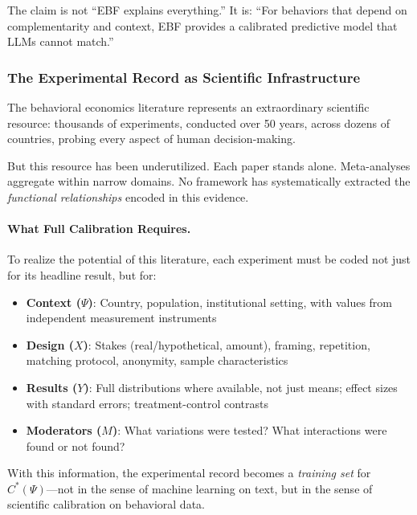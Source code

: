 The claim is not ``EBF explains everything.'' It is: ``For behaviors
that depend on complementarity and context, EBF provides a calibrated
predictive model that LLMs cannot match.''


\subsubsection{The Experimental Record as Scientific Infrastructure}

The behavioral economics literature represents an extraordinary scientific
resource: thousands of experiments, conducted over 50 years, across dozens
of countries, probing every aspect of human decision-making.

But this resource has been underutilized. Each paper stands alone. Meta-analyses
aggregate within narrow domains. No framework has systematically extracted
the \emph{functional relationships} encoded in this evidence.

\paragraph{What Full Calibration Requires.}
To realize the potential of this literature, each experiment must be coded
not just for its headline result, but for:

\begin{itemize}
    \item \textbf{Context ($\Psi$)}: Country, population, institutional setting,
          with values from independent measurement instruments
    \item \textbf{Design ($X$)}: Stakes (real/hypothetical, amount), framing,
          repetition, matching protocol, anonymity, sample characteristics
    \item \textbf{Results ($Y$)}: Full distributions where available, not just
          means; effect sizes with standard errors; treatment-control contrasts
    \item \textbf{Moderators ($M$)}: What variations were tested? What
          interactions were found or not found?
\end{itemize}

With this information, the experimental record becomes a \emph{training set}
for $C^*(\Psi)$---not in the sense of machine learning on text, but in the
sense of scientific calibration on behavioral data.

